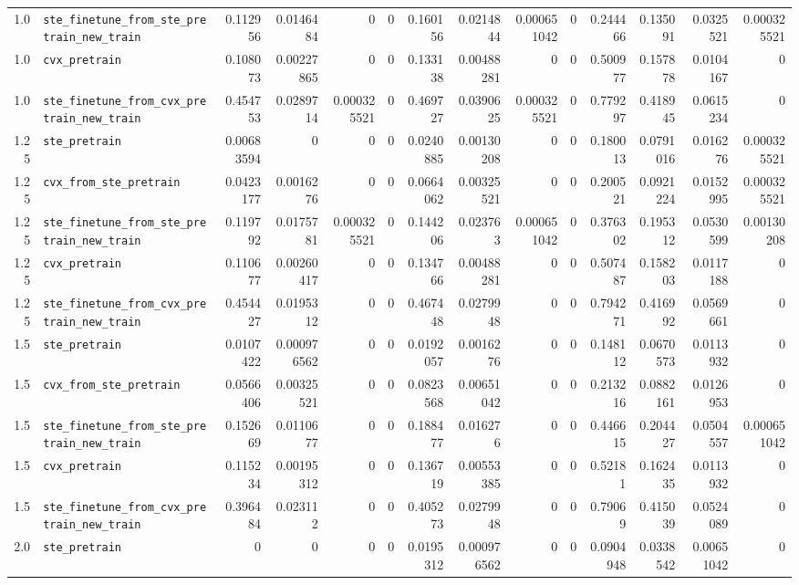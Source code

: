 \begin{longtable}{@{}r l *{12}{r}@{}}
1.0 & \texttt{ste\_finetune\_from\_ste\_pretrain\_new\_train} & 0.112956 & 0.0146484 & 0 & 0 & 0.160156 & 0.0214844 & 0.000651042 & 0 & 0.244466 & 0.135091 & 0.0325521 & 0.000325521 \\
1.0 & \texttt{cvx\_pretrain} & 0.108073 & 0.00227865 & 0 & 0 & 0.133138 & 0.00488281 & 0 & 0 & 0.500977 & 0.157878 & 0.0104167 & 0 \\
1.0 & \texttt{ste\_finetune\_from\_cvx\_pretrain\_new\_train} & 0.454753 & 0.0289714 & 0.000325521 & 0 & 0.469727 & 0.0390625 & 0.000325521 & 0 & 0.779297 & 0.418945 & 0.0615234 & 0 \\
1.25 & \texttt{ste\_pretrain} & 0.00683594 & 0 & 0 & 0 & 0.0240885 & 0.00130208 & 0 & 0 & 0.180013 & 0.0791016 & 0.016276 & 0.000325521 \\
1.25 & \texttt{cvx\_from\_ste\_pretrain} & 0.0423177 & 0.0016276 & 0 & 0 & 0.0664062 & 0.00325521 & 0 & 0 & 0.200521 & 0.0921224 & 0.0152995 & 0.000325521 \\
1.25 & \texttt{ste\_finetune\_from\_ste\_pretrain\_new\_train} & 0.119792 & 0.0175781 & 0.000325521 & 0 & 0.144206 & 0.023763 & 0.000651042 & 0 & 0.376302 & 0.195312 & 0.0530599 & 0.00130208 \\
1.25 & \texttt{cvx\_pretrain} & 0.110677 & 0.00260417 & 0 & 0 & 0.134766 & 0.00488281 & 0 & 0 & 0.507487 & 0.158203 & 0.0117188 & 0 \\
1.25 & \texttt{ste\_finetune\_from\_cvx\_pretrain\_new\_train} & 0.454427 & 0.0195312 & 0 & 0 & 0.467448 & 0.0279948 & 0 & 0 & 0.794271 & 0.416992 & 0.0569661 & 0 \\
1.5 & \texttt{ste\_pretrain} & 0.0107422 & 0.000976562 & 0 & 0 & 0.0192057 & 0.0016276 & 0 & 0 & 0.148112 & 0.0670573 & 0.0113932 & 0 \\
1.5 & \texttt{cvx\_from\_ste\_pretrain} & 0.0566406 & 0.00325521 & 0 & 0 & 0.0823568 & 0.00651042 & 0 & 0 & 0.213216 & 0.0882161 & 0.0126953 & 0 \\
1.5 & \texttt{ste\_finetune\_from\_ste\_pretrain\_new\_train} & 0.152669 & 0.0110677 & 0 & 0 & 0.188477 & 0.016276 & 0 & 0 & 0.446615 & 0.204427 & 0.0504557 & 0.000651042 \\
1.5 & \texttt{cvx\_pretrain} & 0.115234 & 0.00195312 & 0 & 0 & 0.136719 & 0.00553385 & 0 & 0 & 0.52181 & 0.162435 & 0.0113932 & 0 \\
1.5 & \texttt{ste\_finetune\_from\_cvx\_pretrain\_new\_train} & 0.396484 & 0.023112 & 0 & 0 & 0.405273 & 0.0279948 & 0 & 0 & 0.79069 & 0.415039 & 0.0524089 & 0 \\
2.0 & \texttt{ste\_pretrain} & 0 & 0 & 0 & 0 & 0.0195312 & 0.000976562 & 0 & 0 & 0.0904948 & 0.0338542 & 0.00651042 & 0 \\

\end{longtable}
